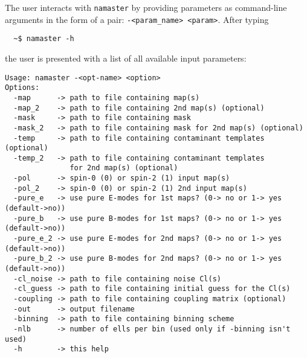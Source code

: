 \documentclass[a4paper,10pt]{article}
\begin{document}
The user interacts with {\tt namaster} by providing parameters as command-line arguments in the form of a pair: {\tt -<param\_name> <param>}. After typing
\begin{verbatim}
  ~$ namaster -h
\end{verbatim}
the user is presented with a list of all available input parameters:
\begin{verbatim}
Usage: namaster -<opt-name> <option>
Options:
  -map      -> path to file containing map(s)
  -map_2    -> path to file containing 2nd map(s) (optional)
  -mask     -> path to file containing mask
  -mask_2   -> path to file containing mask for 2nd map(s) (optional)
  -temp     -> path to file containing contaminant templates (optional)
  -temp_2   -> path to file containing contaminant templates
               for 2nd map(s) (optional)
  -pol      -> spin-0 (0) or spin-2 (1) input map(s)
  -pol_2    -> spin-0 (0) or spin-2 (1) 2nd input map(s)
  -pure_e   -> use pure E-modes for 1st maps? (0-> no or 1-> yes (default->no))
  -pure_b   -> use pure B-modes for 1st maps? (0-> no or 1-> yes (default->no))
  -pure_e_2 -> use pure E-modes for 2nd maps? (0-> no or 1-> yes (default->no))
  -pure_b_2 -> use pure B-modes for 2nd maps? (0-> no or 1-> yes (default->no))
  -cl_noise -> path to file containing noise Cl(s)
  -cl_guess -> path to file containing initial guess for the Cl(s)
  -coupling -> path to file containing coupling matrix (optional)
  -out      -> output filename
  -binning  -> path to file containing binning scheme
  -nlb      -> number of ells per bin (used only if -binning isn't used)
  -h        -> this help
\end{verbatim}
\end{document}
